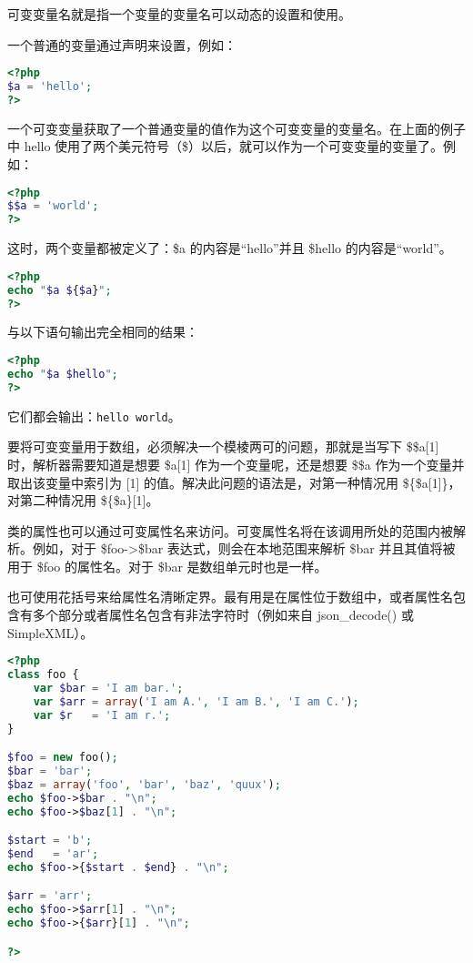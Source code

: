 可变变量名就是指一个变量的变量名可以动态的设置和使用。

一个普通的变量通过声明来设置，例如：


\begin{lstlisting}[language=PHP]
<?php
$a = 'hello';
?>
\end{lstlisting}

一个可变变量获取了一个普通变量的值作为这个可变变量的变量名。在上面的例子中 hello 使用了两个美元符号（\$）以后，就可以作为一个可变变量的变量了。例如：


\begin{lstlisting}[language=PHP]
<?php
$$a = 'world';
?>
\end{lstlisting}

这时，两个变量都被定义了：\$a 的内容是“hello”并且 \$hello 的内容是“world”。

\begin{lstlisting}[language=PHP]
<?php
echo "$a ${$a}";
?>
\end{lstlisting}

与以下语句输出完全相同的结果：

\begin{lstlisting}[language=PHP]
<?php
echo "$a $hello";
?>
\end{lstlisting}

它们都会输出：\verb|hello world|。



要将可变变量用于数组，必须解决一个模棱两可的问题，那就是当写下 \$\$a[1] 时，解析器需要知道是想要 \$a[1] 作为一个变量呢，还是想要 \$\$a 作为一个变量并取出该变量中索引为 [1] 的值。解决此问题的语法是，对第一种情况用 \$\{\$a[1]\}，对第二种情况用 \$\{\$a\}[1]。

类的属性也可以通过可变属性名来访问。可变属性名将在该调用所处的范围内被解析。例如，对于 \$foo->\$bar 表达式，则会在本地范围来解析 \$bar 并且其值将被用于 \$foo 的属性名。对于 \$bar 是数组单元时也是一样。

也可使用花括号来给属性名清晰定界。最有用是在属性位于数组中，或者属性名包含有多个部分或者属性名包含有非法字符时（例如来自 json\_decode() 或 SimpleXML）。




\begin{lstlisting}[language=PHP]
<?php
class foo {
    var $bar = 'I am bar.';
    var $arr = array('I am A.', 'I am B.', 'I am C.');
    var $r   = 'I am r.';
}

$foo = new foo();
$bar = 'bar';
$baz = array('foo', 'bar', 'baz', 'quux');
echo $foo->$bar . "\n";
echo $foo->$baz[1] . "\n";

$start = 'b';
$end   = 'ar';
echo $foo->{$start . $end} . "\n";

$arr = 'arr';
echo $foo->$arr[1] . "\n";
echo $foo->{$arr}[1] . "\n";

?>
\end{lstlisting}



